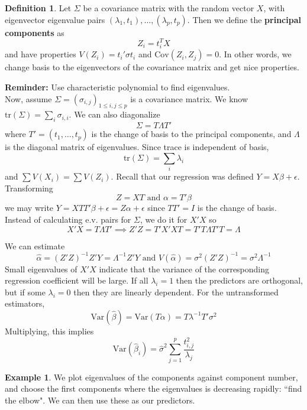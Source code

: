 \documentclass[12pt, a4paper]{article}
\theoremstyle{definition}
\newtheorem{definition}{Definition}
\newtheorem{example}{Example}
\newcommand{\lam}{\lambda}
\newcommand{\imp}{\implies}
\newcommand{\eps}{\epsilon}
\newcommand{\f}{\frac}
\newcommand{\Cov}{\mathrm{Cov}}
\newcommand{\tr}{\mathrm{tr}}
\begin{document}
	\begin{definition}
		Let $\Sigma$ be a covariance matrix with the random vector $X$, with eigenvector eigenvalue pairs $(\lambda_1, t_1), \ldots, (\lambda_p, t_p)$. Then we define the {\bf principal components} as
		$$
			Z_i = t_i^TX
		$$
		and have properties $V(Z_i) = t_i' \sigma t_i$ and $\Cov(Z_i, Z_j) = 0$. In other words, we change basis to the eigenvectors of the covariance matrix and get nice properties.
	\end{definition}
	
	{\bf Reminder:} Use characteristic polynomial to find eigenvalues.\\
	
	Now, assume $\Sigma = (\sigma_{i,j})_{1 \leq i,j \leq p}$ is a covariance matrix. We know $\tr(\Sigma) = \sum_i \sigma_{i,i}$. We can also diagonalize 
	$$\Sigma = T \Lambda T'$$
	 where $T' = (t_1, \ldots, t_p)$ is the change of basis to the principal components, and $\Lambda$ is the diagonal matrix of eigenvalues. Since trace is independent of basis, 
	 $$\tr(\Sigma) = \sum_i \lambda_i$$
	  and $\sum V(X_i) = \sum V(Z_i)$. Recall that our regression was defined $Y = X \beta + \eps$. Transforming 
	  $$Z = XT \text{ and }\alpha = T'\beta$$
	  we may write $Y = XTT'\beta + \eps = Z \alpha + \eps$ since $TT' = I$ is the change of basis. Instead of calculating e.v. pairs for $\Sigma$, we do it for $X'X$ so 
	  $$
	  	X'X  = T\Lambda T' \imp Z'Z = T'X'XT = T'T\Lambda T'T = \Lambda
	  $$
	  
	 We can estimate 
	 $$\hat \alpha = (Z'Z)^{-1}Z'Y = \Lambda^{-1}Z'Y \text{ and } V(\hat \alpha) = \sigma^2 (Z'Z)^{-1} = \sigma^2 \Lambda^{-1}$$
	 Small eigenvalues of $X'X$ indicate that the variance of the corresponding regression coefficient will be large. If all $\lam_i = 1$ then the predictors are orthogonal, but if some $\lam_i = 0$ then they are linearly dependent. For the untransformed estimators,
	 $$
	 	\text{Var}(\hat \beta) = \text{Var}( T\alpha) = T \lambda^{-1}T'\sigma^2
 	$$
 	Multiplying, this implies
 	$$
 		\text{Var}(\hat \beta_i) = \hat \sigma^2 \sum_{j=1}^p \f{t_{i,j}^2}{\lam_j}
 	$$
	 
	 \begin{example}
	 	We plot eigenvalues of the components against component number, and choose the first components where the eigenvalues is decreasing rapidly: ``find the elbow". We can then use these as our predictors.
	 \end{example}
	
	
	
\end{document}
